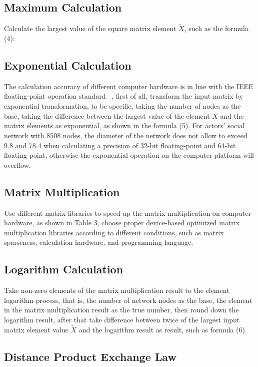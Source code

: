 \documentclass[review]{cvpr}
\begin{document}
\subsection{Maximum Calculation}

Calculate the largest value of the square matrix element $\widetilde X$, such as the formula (4):

\subsection{Exponential Calculation}

The calculation accuracy of different computer hardware is in line with the IEEE floating-point operation standard ~\cite{ieee1985ieee},
first of all, transform the input matrix by exponential transformation, to be specific, taking the number of nodes as the base,
taking the difference between the largest value of the element $\widetilde X$ and the matrix elements as exponential, as shown in the formula (5).
\eg For actors' social network with 8508 nodes, the diameter of the network does not allow to exceed 9.8 and 78.4 when calculating a precision of 32-bit floating-point and 64-bit floating-point,
otherwise the exponential operation on the computer platform will overflow.

\subsection{Matrix Multiplication}
Use different matrix libraries to speed up the matrix multiplication on computer hardware, as shown in Table 3, choose proper device-based optimized matrix multiplication libraries according to different conditions, such as matrix sparseness, calculation hardware, and programming language.

\subsection{Logarithm Calculation}
Take non-zero elements of the matrix multiplication result to the element logarithm process, that is, the number of network nodes as the base, the element in the matrix multiplication result as the true number, then round down the logarithm result,
after that take difference between twice of the largest input matrix element value $\widetilde X$ and the logarithm result as result, such as formula (6).

\subsection{Distance Product Exchange Law}
\end{document}
